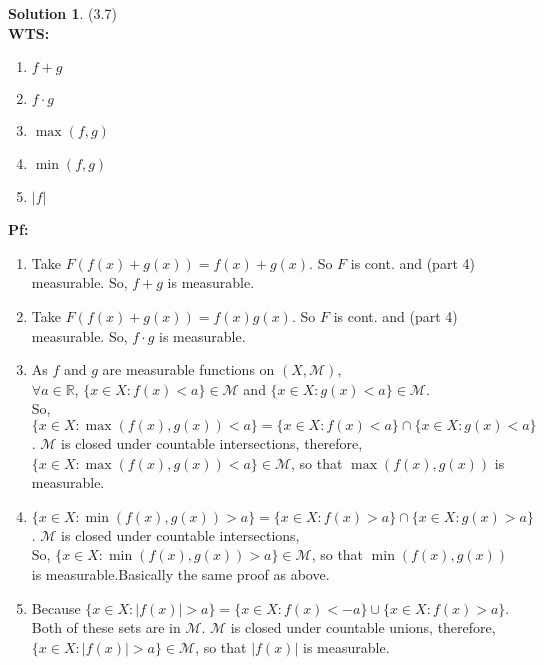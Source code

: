 \documentclass[letterpaper,12pt]{article}
\theoremstyle{definition}
\newtheorem{solution}[theorem]{Solution}
\begin{document}
\begin{solution}{(3.7)} \\
\textbf{WTS:}
\begin{enumerate}
	\item $f + g$
	\item $f \cdot g$
	\item $\max(f,g)$
	\item $\min(f,g)$
	\item $|f|$
\end{enumerate}
\textbf{Pf:}
\begin{enumerate}
  \item Take $F(f(x) + g(x)) = f(x) + g(x)$. So $F$ is cont. and (part 4) measurable. So, $f + g$ is measurable.
  \item Take $F(f(x) + g(x)) = f(x)g(x)$. So $F$ is cont. and (part 4) measurable. So, $f \cdot g$ is measurable.
  \item As $f$ and $g$ are measurable functions on $(X,\mathcal{M})$, \\$ \forall a \in \mathbb{R}$, $\{x \in X : f(x) < a \} \in \mathcal{M}$ and $\{x \in X : g(x) < a \} \in \mathcal{M}$. \\
  So,  $\{x \in X : \max(f(x),g(x)) < a \} = \{x \in X : f(x) < a \} \cap \{x \in X : g(x) < a \}$. $\mathcal{M}$ is closed under countable intersections, therefore, $\{x \in X : \max(f(x),g(x)) < a \} \in \mathcal{M}$, so that $\max(f(x), g(x))$ is measurable.
  \item $\{x \in X : \min(f(x),g(x)) > a \} = \{x \in X : f(x) > a \} \cap \{x \in X : g(x) > a \}$. $\mathcal{M}$ is closed under countable intersections, \\
  So, $\{x \in X : \min(f(x),g(x)) > a \} \in \mathcal{M}$, so that $\min(f(x), g(x))$ is measurable.Basically the same proof as above.
  \item Because $\{x \in X : |f(x)| > a \} = \{x \in X : f(x) < -a \} \cup \{x \in X : f(x) > a \}$. Both of these sets are in $\mathcal{M}$. $\mathcal{M}$ is closed under countable unions, therefore, $\{x \in X : |f(x)| > a \} \in \mathcal{M}$, so that $|f(x)|$ is measurable.
\end{enumerate}
\end{solution}
\end{document}
